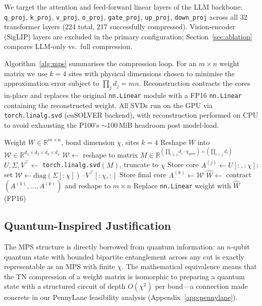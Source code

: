 \documentclass[10pt,twocolumn]{article}
\begin{document}
We target the attention and feed-forward linear layers of the LLM backbone:
\texttt{q\_proj}, \texttt{k\_proj}, \texttt{v\_proj}, \texttt{o\_proj},
\texttt{gate\_proj}, \texttt{up\_proj}, \texttt{down\_proj} across all 32
transformer layers (224 total, 217 successfully compressed). Vision-encoder
(SigLIP) layers are excluded in the primary configuration; Section~\ref{sec:ablation}
compares LLM-only vs.\ full compression.

Algorithm~\ref{alg:mps} summarises the compression loop.
For an $m \times n$ weight matrix we use $k=4$ sites with physical dimensions
chosen to minimise the approximation error subject to $\prod_j d_j = mn$.
Reconstruction contracts the cores in-place and replaces the original
\texttt{nn.Linear} module with a FP16 \texttt{nn.Linear} containing the
reconstructed weight. All SVDs run on the GPU via \texttt{torch.linalg.svd}
(cuSOLVER backend), with reconstruction performed on CPU to avoid exhausting the
P100's $\sim$100\,MiB headroom post model-load.

\begin{algorithm}[t]
\small
\caption{MPS weight compression}\label{alg:mps}
\begin{algorithmic}[1]
\Require Weight $W \in \mathbb{R}^{m \times n}$, bond dimension $\chi$, sites $k=4$
\State Reshape $W$ into $\mathcal{W} \in \mathbb{R}^{d_1 \times d_2 \times d_3 \times d_4}$
  \State $\mathcal{W} \leftarrow$ reshape to matrix $M \in \mathbb{R}^{(\prod_{i \leq j} d_i \cdot \chi_\text{prev}) \times (\prod_{i > j} d_i)}$
  \State $U, \Sigma, V^\top \leftarrow$ \texttt{torch.linalg.svd}$(M)$, truncate to $\chi$
  \State Store core $A^{(j)} \leftarrow U[:, :\chi]$; set $\mathcal{W} \leftarrow \text{diag}(\Sigma[:\chi]) \cdot V^\top[:\chi,:]$
\EndFor
\State Store final core $A^{(k)} \leftarrow \mathcal{W}$
\State $\hat{W} \leftarrow$ contract$(A^{(1)}, \ldots, A^{(k)})$ and reshape to $m \times n$
\State Replace \texttt{nn.Linear} weight with $\hat{W}$ (FP16)
\end{algorithmic}
\end{algorithm}

\subsection{Quantum-Inspired Justification}

The MPS structure is directly borrowed from quantum information: an $n$-qubit
quantum state with bounded bipartite entanglement across any cut is exactly
representable as an MPS with finite $\chi$. The mathematical equivalence means that
the TN compression of a weight matrix is isomorphic to preparing a quantum state
with a structured circuit of depth $O(\chi^2)$ per bond---a connection made concrete
in our PennyLane feasibility analysis (Appendix~\ref{app:pennylane}).
\end{document}
